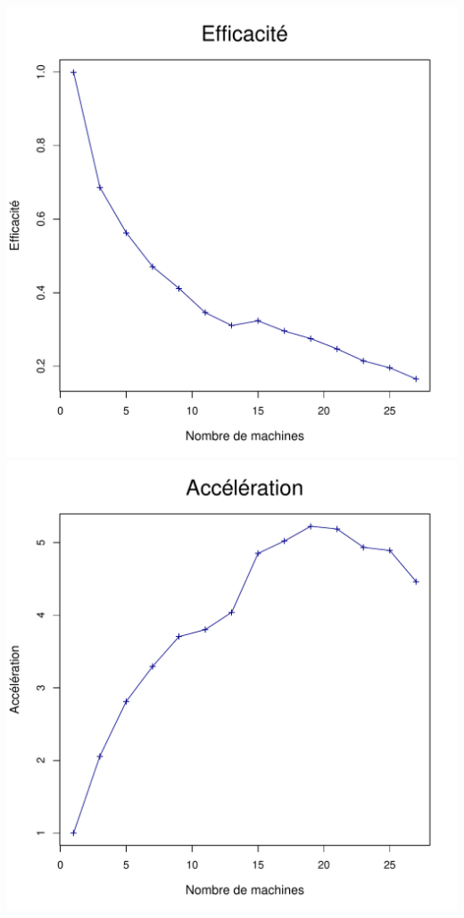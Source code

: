 \documentclass[a4paper, 11pt, titlepage]{article}
\begin{document}
\begin{center}
    \includegraphics[scale=0.45]{res/sujet_makefiles_blender_249_Makefile_nth1_eff.pdf}
    \includegraphics[scale=0.45]{res/sujet_makefiles_blender_249_Makefile_nth1_acc.pdf}

\end{center}
\end{document}

